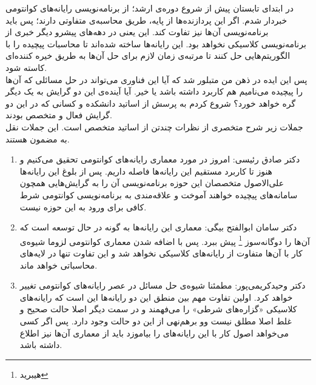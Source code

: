 در ابتدای تابستان پیش از شروع دوره‌ی ارشد؛ از برنامه‌نویسی رایانه‌های کوانتومی خبردار شدم. اگر این پردازنده‌ها از پایه، طریق محاسبه‌ی متفاوتی دارند؛ پس باید برنامه‌نویسی آن‌ها نیز تفاوت کند. این یعنی در دهه‌های پیشرو دیگر خبری از برنامه‌نویسی کلاسیکی نخواهد بود. این رایانه‌ها ساخته شده‌اند تا محاسبات پیچیده را با الگوریتم‌هایی حل کنند تا مرتبه‌ی زمان لازم برای حل آن‌ها به طریق خیره کننده‌ای کاسته شود.\\
پس این ایده در ذهن من متبلور شد که آیا این فناوری می‌تواند در حل مسائلی که آن‌ها را پیچیده می‌نامیم هم کاربرد داشته باشد یا خیر.  آیا آینده‌ی این دو گرایش به یک دیگر گره خواهد خورد؟ شروع کردم به پرسش از اساتید دانشکده و کسانی که در این دو گرایش فعال و متخصص بودند.\\
جملات زیر شرح متخصری از نظرات چندتن از اساتید متخصص است. این جملات نقل به مضمون هستند.
\begin{enumerate}
	\item 
	دکتر صادق رئیسی: امروز در مورد معماری رایانه‌های کوانتومی تحقیق می‌کنیم و هنوز تا کاربرد مستقیم این رایانه‌ها فاصله داریم. پس از بلوغ این رایانه‌ها علی‌الاصول متخصصان این حوزه برنامه‌نویسی آن را به گرایش‌هایی همچون سامانه‌های پیچیده خواهند آموخت و علاقه‌مندی به برنامه‌نویسی کوانتومی شرط کافی برای ورود به این حوزه نیست.
	\item
	دکتر سامان ابوالفتح بیگی: معماری این رایانه‌ها به گونه در حال توسعه است که آن‌ها را دوگانه‌سوز \footnote{هیبرید} پیش ببرد. پس با اضافه شدن معماری کوانتومی لزوما شیوه‌ی کار با آن‌ها متفاوت از رایانه‌های کلاسیکی نخواهد شد و این تفاوت تنها در لایه‌های محاسباتی خواهد ماند.
	\item 
	دکتر وحیدکریمی‌پور: مطمئنا شیوه‌ی حل مسائل در عصر رایانه‌های کوانتومی تغییر خواهد کرد. اولین تفاوت مهم بین منطق این دو رایانه‌ها این است که رایانه‌های کلاسیکی «گزاره‌های شرطی» را می‌فهمند و در سمت دیگر اصلا حالت صحیح و غلط اصلا مطلق نیست وو برهم‌نهی از این دو حالت وجود دارد. پس اگر کسی می‌خواهد اصول کار با این رایانه‌های را بیاموزد باید از معماری آن‌ها نیز اطلاع داشته باشد.

\end{enumerate}



